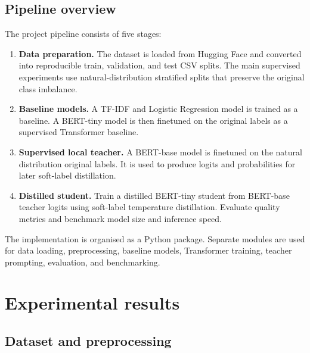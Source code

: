 \documentclass[pdflatex,sn-mathphys-num]{sn-jnl}
\begin{document}
\subsection{Pipeline overview}

The project pipeline consists of five stages:

\begin{enumerate}
    \item \textbf{Data preparation.} The dataset is loaded from Hugging Face and converted into reproducible train, validation, and test CSV splits. 
    The main supervised experiments use natural-distribution stratified splits that preserve the original class imbalance.
    \item \textbf{Baseline models.} A TF-IDF and Logistic Regression model is trained as a baseline. 
    A BERT-tiny model is then finetuned on the original labels as a supervised Transformer baseline.
    \item \textbf{Supervised local teacher.} A BERT-base model is finetuned on the natural distribution original labels.
    It is used to produce logits and probabilities for later soft-label distillation.
    \item \textbf{Distilled student.} Train a distilled BERT-tiny student from BERT-base teacher logits using soft-label temperature distillation. 
    Evaluate quality metrics and benchmark model size and inference speed.
\end{enumerate}

The implementation is organised as a Python package.
Separate modules are used for data loading, preprocessing, baseline models, Transformer training, teacher prompting, evaluation, and benchmarking. 

\section{Experimental results}\label{sec:results}

\subsection{Dataset and preprocessing}
\end{document}
